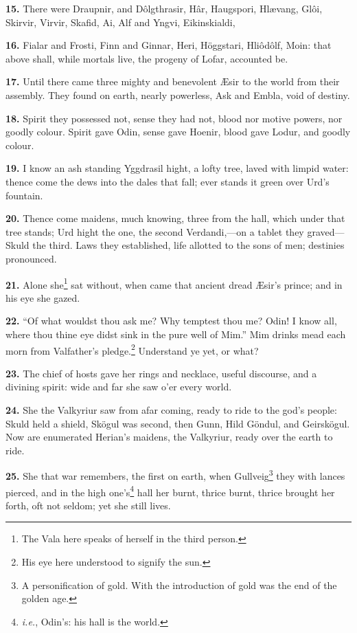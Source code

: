 \textbf{15.} There were Draupnir, and Dôlgthrasir, Hâr, Haugspori, Hlævang,
Glôi, Skirvir, Virvir, Skafid, Ai, Alf and Yngvi, Eikinskialdi,

\textbf{16.} Fialar and Frosti, Finn and Ginnar, Heri, Höggstari, Hliôdôlf,
Moin: that above shall, while mortals live, the progeny of Lofar,
accounted be.

\textbf{17.} Until there came three mighty and benevolent Æsir to the world
from their assembly. They found on earth, nearly powerless, Ask and
Embla, void of destiny.

\textbf{18.} Spirit they possessed not, sense they had not, blood nor motive
powers, nor goodly colour. Spirit gave Odin, sense gave Hoenir, blood
gave Lodur, and goodly colour.

\textbf{19.} I know an ash standing Yggdrasil hight, a lofty tree, laved with
limpid water: thence come the dews into the dales that fall; ever
stands it green over Urd's fountain.

\textbf{20.} Thence come maidens, much knowing, three from the hall, which
under that tree stands; Urd hight the one, the second Verdandi,—on a
tablet they graved—Skuld the third. Laws they established, life
allotted to the sons of men; destinies pronounced.

\textbf{21.} Alone she\footnote{The Vala here speaks of herself in the third person.} sat without, when came that ancient dread Æsir's
prince; and in his eye she gazed.

\textbf{22.} ``Of what wouldst thou ask me? Why temptest thou me? Odin! I know
all, where thou thine eye didst sink in the pure well of Mim.'' Mim
drinks mead each morn from Valfather's pledge.\footnote{His eye here understood to signify the sun.} Understand ye yet,
or what?

\textbf{23.} The chief of hosts gave her rings and necklace, useful
discourse, and a divining spirit: wide and far she saw o'er every
world.

\textbf{24.} She the Valkyriur saw from afar coming, ready to ride to the
god's people: Skuld held a shield, Skögul was second, then Gunn, Hild
Göndul, and Geirskögul. Now are enumerated Herian's maidens, the
Valkyriur, ready over the earth to ride.

\textbf{25.} She that war remembers, the first on earth, when Gullveig\footnote{A personification of gold. With the introduction of gold
was the end of the golden age.}
they with lances pierced, and in the high one's\footnote{\emph{i.e.}, Odin's: his hall is the world.} hall her burnt,
thrice burnt, thrice brought her forth, oft not seldom; yet she still
lives.

